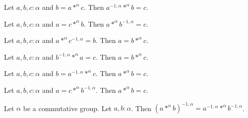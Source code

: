 \documentclass{article}
\begin{document}
\begin{forthel}
\begin{lemma}
Let $a,b,c : \alpha$ and $b = a *^{\alpha} c$.
Then $a^{-1,\alpha} *^{\alpha} b = c$.
\end{lemma}

\begin{lemma}
Let $a,b,c : \alpha$ and $a = c *^{\alpha} b$.
Then $a *^{\alpha} b^{-1,\alpha} = c$.
\end{lemma}

\begin{lemma}
Let $a,b,c : \alpha$ and $a *^{\alpha} c^{-1,\alpha} = b$.
Then $a = b *^{\alpha} c$.
\end{lemma}

\begin{lemma}
Let $a,b,c : \alpha$ and $b^{-1,\alpha} *^{\alpha} a = c$.
Then $a = b *^{\alpha} c$.
\end{lemma}

\begin{lemma}
Let $a,b,c : \alpha$ and $b = a^{-1,\alpha} *^{\alpha} c$.
Then $a *^{\alpha} b = c$.
\end{lemma}

\begin{lemma}
Let $a,b,c : \alpha$ and $a = c *^{\alpha} b^{-1,\alpha}$.
Then $a *^{\alpha} b = c$.
\end{lemma}

\begin{lemma}
Let $\alpha$ be a commutative group.
Let $a,b : \alpha$.
Then $(a *^{\alpha} b)^{-1,\alpha} = a^{-1,\alpha} *^{\alpha} b^{-1,\alpha}$.
\end{lemma}

\end{forthel}
\end{document}
